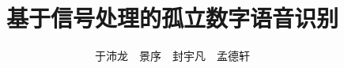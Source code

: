 \documentclass[xcolor=table,dvipsnames,svgnames,aspectratio=169,t]{ctexbeamer}
\author{于沛龙\ \ 景序\ \ 封宇凡\ \ 孟德轩}
\title[孤立数字语音识别]
{\textbf{基于信号处理的孤立数字语音识别}}
\begin{document}
\maketitle







\makebottom
\end{document}
